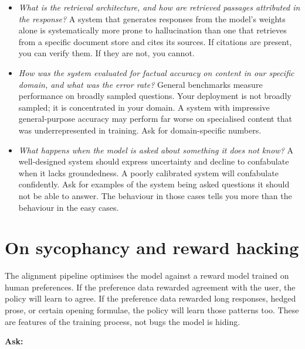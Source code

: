 \begin{itemize}
  \item \emph{What is the retrieval architecture, and how
        are retrieved passages attributed in the response?}
        A system that generates responses from the model's
        weights alone is systematically more prone to
        hallucination than one that retrieves from a
        specific document store and cites its sources.
        If citations are present, you can verify them.
        If they are not, you cannot.

  \item \emph{How was the system evaluated for factual
        accuracy on content in our specific domain, and
        what was the error rate?} General benchmarks
        measure performance on broadly sampled questions.
        Your deployment is not broadly sampled; it is
        concentrated in your domain. A system with
        impressive general-purpose accuracy may perform
        far worse on specialised content that was
        underrepresented in training. Ask for domain-specific
        numbers.

  \item \emph{What happens when the model is asked about
        something it does not know?} A well-designed system
        should express uncertainty and decline to confabulate
        when it lacks groundedness. A poorly calibrated system
        will confabulate confidently. Ask for examples of
        the system being asked questions it should not be
        able to answer. The behaviour in those cases tells
        you more than the behaviour in the easy cases.
\end{itemize}

\section{On sycophancy and reward hacking}

The alignment pipeline optimises the model against a reward
model trained on human preferences. If the preference data
rewarded agreement with the user, the policy will learn to
agree. If the preference data rewarded long responses, hedged
prose, or certain opening formulae, the policy will learn
those patterns too. These are features of the training
process, not bugs the model is hiding.

\medskip
\noindent\textbf{Ask:}

